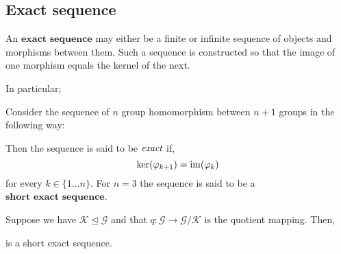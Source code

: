 
\subsection{Exact sequence} %
\label{sec:exactsequence}
An $\textbf{exact sequence}$ may  either be a finite or infinite sequence of objects and morphisms between them.
Such a sequence is constructed so that the image of one morphism equals the kernel of the next.

In particular;

\begin{defn}
	Consider the sequence of $n$ group homomorphism between $n+1$ groups
	in the following way:

	\begin{center}
\end{center}

Then the sequence is said to be $\emph{exact}$ if,
\[
	\ker(\varphi_{k+1}) = \operatorname{im}(\varphi_{k})
\]
for every $k \in \{1 \dots n\}$. For $n=3$ the sequence is said to be a
$\textbf{short exact sequence}$.
\end{defn}

\begin{exmp}
	Suppose we have $\mathcal{K} \unlhd \mathcal{G}$ and that
	$q: \mathcal{G} \to \mathcal{G} / \mathcal{K}$ is the quotient mapping.
	Then,
	\begin{center}
\end{center}
is a short exact sequence.
\end{exmp}
